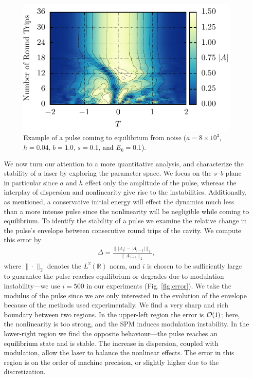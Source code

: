 \documentclass[9pt,twocolumn,twoside]{osajnl}
\let\originalleft\left
\let\originalright\right
\renewcommand{\left}{\mathopen{}\mathclose\bgroup\originalleft}
\renewcommand{\right}{\aftergroup\egroup\originalright}
\providecommand{\bigO}[1]{\ensuremath{\mathop{}\mathopen{}\mathcal{O}\mathopen{}\left(#1\right)}} %
\begin{document}
\begin{figure}[tbp]
	\centering
	\includegraphics{Figures/Conv}
	\caption{Example of a pulse coming to equilibrium from noise ($a = 8 \times 10^3$, $h = 0.04$, $b = 1.0$, $s = 0.1$, and $E_0 = 0.1$).}
	\label{fig:convevo}
\end{figure}

We now turn our attention to a more quantitative analysis, and characterize the stability of a laser by exploring the parameter space. We focus on the $s$--$b$ plane in particular since $a$ and $h$ effect only the amplitude of the pulse, whereas the interplay of dispersion and nonlinearity give rise to the instabilities. Additionally, as mentioned, a conservative initial energy will effect the dynamics much less than a more intense pulse since the nonlinearity will be negligible while coming to equilibrium. To identify the stability of a pulse we examine the relative change in the pulse's envelope between consecutive round trips of the cavity. We compute this error by
\begin{align}
	\Delta = \frac{\| |A_i| - |A_{i-1}| \|_2}{\| A_{i-1} \|_2},
	\label{eq:error}
\end{align}
where $\| \cdot \|_2$ denotes the $L^2(\mathbb{R})$ norm, and $i$ is chosen to be sufficiently large to guarantee the pulse reaches equilibrium or degrades due to modulation instability---we use $i = 500$ in our experiments (Fig. \ref{fig:error}). We take the modulus of the pulse since we are only interested in the evolution of the envelope because of the methods used experimentally. We find a very sharp and rich boundary between two regions. In the upper-left region the error is $\bigO{1}$; here, the nonlinearity is too strong, and the SPM induces modulation instability. In the lower-right region we find the opposite behaviour---the pulse reaches an equilibrium state and is stable. The increase in dispersion, coupled with modulation, allow the laser to balance the nonlinear effects. The error in this region is on the order of machine precision, or slightly higher due to the discretization.
\end{document}
